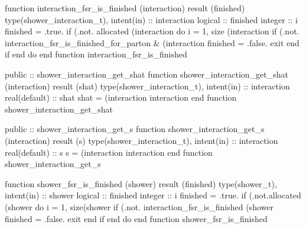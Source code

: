 \eatline
\nwendcode{}\nwdocspar
\nwenddocs{}\plusendmoddef
  function interaction_fsr_is_finished (interaction) result (finished)
    type(shower_interaction_t), intent(in) :: interaction
    logical :: finished
    integer :: i
    finished = .true.
    if (.not. allocated (interaction%
    do i = 1, size (interaction%
       if (.not. interaction_fsr_is_finished_for_parton &
            (interaction%
          finished = .false.
          exit
       end if
    end do
  end function interaction_fsr_is_finished

\eatline
\nwendcode{}\nwdocspar
\nwenddocs{}\plusendmoddef
  public :: shower_interaction_get_shat
\nwendcode{}\plusendmoddef
  function shower_interaction_get_shat (interaction) result (shat)
    type(shower_interaction_t), intent(in) :: interaction
    real(default) :: shat
    shat = (interaction%
            interaction%
  end function shower_interaction_get_shat

\eatline
\nwendcode{}\nwdocspar
\nwenddocs{}\plusendmoddef
  public :: shower_interaction_get_s
\nwendcode{}\plusendmoddef
  function shower_interaction_get_s (interaction) result (s)
    type(shower_interaction_t), intent(in) :: interaction
    real(default) :: s
    s = (interaction%
         interaction%
  end function shower_interaction_get_s

\eatline
\nwendcode{}\nwdocspar
\nwenddocs{}\plusendmoddef
  function shower_fsr_is_finished (shower) result (finished)
    type(shower_t), intent(in) :: shower
    logical :: finished
    integer :: i
    finished = .true.
    if (.not.allocated (shower%
    do i = 1, size(shower%
       if (.not. interaction_fsr_is_finished (shower%
          finished = .false.
          exit
       end if
    end do
  end function shower_fsr_is_finished

